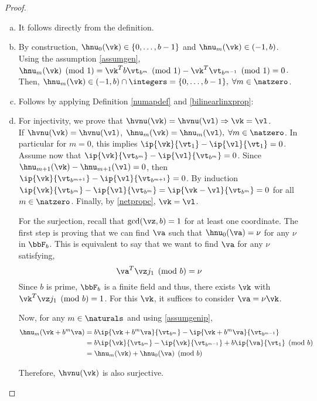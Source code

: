 \documentclass[]{elsarticle}
\theoremstyle{definition}
\begin{document}
\begin{proof}
\begin{enumerate}[a)]
\item It follows directly from the definition.
\item By construction, $\hnu_0(\vk)\in\{0,\dots,b-1\}$ and $\hnu_m(\vk)\in (-1,b)$. Using the assumption \eqref{assumgen}, $\hnu_m(\vk)\pmod 1=\vk^Tb\vt_{b^m}\pmod 1-\vk^T\vt_{b^{m-1}}\pmod 1=0$. Then, $\hnu_m(\vk)\in (-1,b)\cap\integers=\{0,\dots,b-1\},\;\forall m\in\natzero$.
\item Follows by applying  Definition \ref{numapdef} and \eqref{bilinearlinxprop}:

\item For injectivity, we prove that $\hvnu(\vk)=\hvnu(\vl) \Rightarrow \vk = \vl$.\\ If $\hvnu(\vk)=\hvnu(\vl)$, $\hnu_m(\vk)=\hnu_m(\vl),\;\forall m\in\natzero$. In particular for $m=0$, this implies $\ip{\vk}{\vt_1}-\ip{\vl}{\vt_1}=0$. Assume now that $\ip{\vk}{\vt_{b^m}}-\ip{\vl}{\vt_{b^m}}=0$. Since $\hnu_{m+1}(\vk)-\hnu_{m+1}(\vl)=0$, then $\ip{\vk}{\vt_{b^{m+1}}}-\ip{\vl}{\vt_{b^{m+1}}}=0$. By induction $\ip{\vk}{\vt_{b^{m}}}-\ip{\vl}{\vt_{b^{m}}}=\ip{\vk-\vl}{\vt_{b^{m}}}=0$ for all $m\in\natzero$. Finally, by \eqref{netpropc}, $\vk=\vl$.
    
    For the surjection, recall that $\gcd(\vz,b)=1$ for at least one coordinate. The first step is proving that we can find $\va$ such that $\hnu_0(\va)=\nu$ for any $\nu$ in $\bbF_b$. This is equivalent to say that we want to find $\va$ for any $\nu$ satisfying,
\[
\va^T\vz j_1\pmod b=\nu
\]
    Since $b$ is prime, $\bbF_b$ is a finite field and thus, there exists $\vk$ with $\vk^T\vz j_1 \pmod b=1$. For this $\vk$, it suffices to consider $\va=\nu\vk$.
    
    Now, for any $m\in\naturals$ and using \eqref{assumgenip},
\begin{align*}
\hnu_m(\vk+b^m\va)&=b\ip{\vk+b^m\va}{\vt_{b^m}}-\ip{\vk+b^m\va}{\vt_{b^{m-1}}}\\
&=b\ip{\vk}{\vt_{b^m}}-\ip{\vk}{\vt_{b^{m-1}}}+b\ip{\va}{\vt_{1}} \pmod b \\
&=\hnu_m(\vk)+\hnu_0(\va) \pmod b
\end{align*}
    
    Therefore, $\hvnu(\vk)$ is also surjective.
\end{enumerate}
\end{proof}
\end{document}
